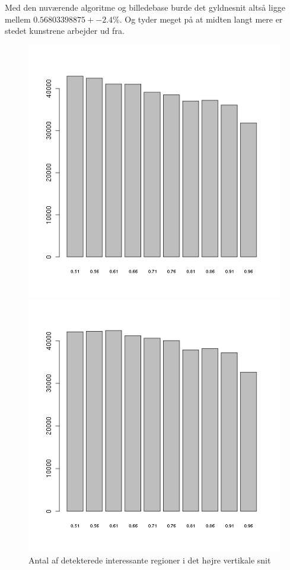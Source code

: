 {Med den nuværende algoritme og billedebase burde det gyldnesnit
altså ligge mellem $0.56803398875 +- 2.4\%$.
Og tyder meget på at midten langt mere er stedet kunstrene arbejder
ud fra.
\begin{figure}[ht]
	\begin{minipage}[b]{0.5\linewidth}
		\begin{center}
		\includegraphics[scale=0.4]{afsnit/resultater/billeder/cut0featsperratio.png}
		\caption{Antal af detekterede interessante regioner i det højre
		vertikale snit}
		\label{cut0feats}
		\end{center}
	\end{minipage}
	\hspace{0.5cm}
	\begin{minipage}[b]{0.5\linewidth}
		\begin{center}
		\includegraphics[scale=0.4]{afsnit/resultater/billeder/cut1featsperratio.png}

\end{center}
\end{minipage}
\end{figure}}
